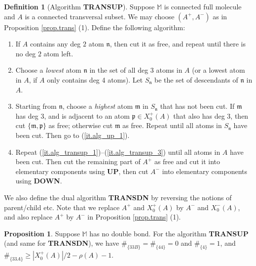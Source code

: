 \documentclass[10pt, reqno]{amsart}
\newcommand{\Mb}{\mathbb M}
\newcommand{\mf}{\mathfrak m}
\newcommand{\pf}{\mathfrak p}
\newcommand{\nf}{\mathfrak n}
\theoremstyle{definition}
\newtheorem{proposition}[theorem]{Proposition}
\newtheorem{definition}[theorem]{Definition}
\theoremstyle{remark}
\numberwithin{equation}{section}
\begin{document}
\begin{definition}[Algorithm \textbf{TRANSUP}]
\label{def.alg_transup}
Suppose $\Mb$ is connected full molecule and $A$ is a connected transversal subset. We may choose $(A^+,A^-)$ as in Proposition \ref{prop.trans} (1). Define the following algorithm:
\begin{enumerate}
\item\label{it.alg_transup_1} If $A$ contains any deg $2$ atom $\nf$, then cut it as free, and repeat until there is no deg $2$ atom left.
\item\label{it.alg_transup_2} Choose a \emph{lowest} atom $\nf$ in the set of all deg 3 atoms in $A$ (or a lowest atom in $A$, if $A$ only contains deg 4 atoms). Let $S_\nf$ be the set of descendants of $\nf$ in $A$.
\item \label{it.alg_transup_3} Starting from $\nf$, choose a \emph{highest} atom $\mf$ in $S_\nf$ that has not been cut. If $\mf$ has deg 3, and is adjacent to an atom $\pf\in X_0^+(A)$ that also has deg 3, then cut $\{\mf,\pf\}$ as free; otherwise cut $\mf$ as free. Repeat until all atoms in $S_\nf$ have been cut. Then go to (\ref{it.alg_up_1}).
\item \label{it.alg_transup_4} Repeat (\ref{it.alg_transup_1})--(\ref{it.alg_transup_3}) until all atoms in $A$ have been cut. Then cut the remaining part of $A^+$ as free and cut it into elementary components using \textbf{UP}, then cut $A^-$ into elementary components using \textbf{DOWN}.
\end{enumerate}
We also define the dual algorithm \textbf{TRANSDN} by reversing the notions of parent/child etc. Note that we replace $A^+$ and $X_0^+(A)$ by $A^-$ and $X_0^-(A)$, and also replace $A^+$ by $A^-$ in Proposition \ref{prop.trans} (1).
\end{definition}
\begin{proposition}
\label{prop.alg_transup} Suppose $\Mb$ has no double bond. For the algorithm \textbf{TRANSUP} (and same for \textbf{TRANSDN}), we have $\#_{\{33B\}}=\#_{\{44\}}=0$ and $\#_{\{4\}}=1$, and $\#_{\{33A\}}\geq |X_0^+(A)|/2-\rho(A)-1$.
\end{proposition}
\end{document}
